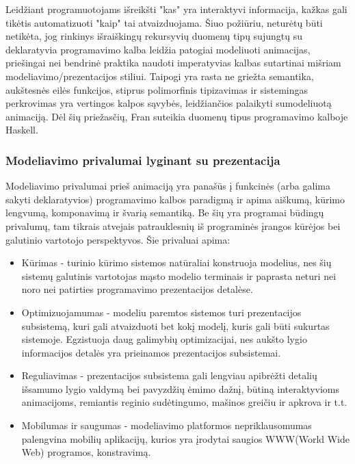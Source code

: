 Leidžiant programuotojams išreikšti "kas" yra interaktyvi informacija, kažkas gali tikėtis automatizuoti "kaip" tai atvaizduojama. Šiuo požiūriu, neturėtų būti netikėta, jog rinkinys išraiškingų rekursyvių duomenų tipų sujungtų su deklaratyvia programavimo kalba leidžia patogiai modeliuoti animacijas, priešingai nei bendrinė praktika naudoti imperatyvias kalbas sutartinai mišriam modeliavimo/prezentacijos stiliui. Taipogi yra rasta ne griežta semantika, aukštesnės eilės funkcijos, stiprus polimorfinis tipizavimas ir sistemingas perkrovimas yra vertingos kalpos sąvybės, leidžiančios palaikyti sumodeliuotą animaciją. Dėl šių priežasčių, Fran suteikia duomenų tipus programavimo kalboje Haskell.

\subsubsection{Modeliavimo privalumai lyginant su prezentacija}

Modeliavimo privalumai prieš animaciją yra panašūs į funkcinės (arba galima sakyti deklaratyvios) programavimo kalbos paradigmą ir apima aiškumą, kūrimo lengvumą, komponavimą ir švarią semantiką. Be šių yra programai būdingų privalumų, tam tikrais atvejais patrauklesnių iš programinės įrangos kūrėjos bei galutinio vartotojo perspektyvos. Šie privaluai apima:

\begin{itemize}

	\item Kūrimas - turinio kūrimo sistemos natūraliai konstruoja modelius, nes šių sistemų galutinis vartotojas mąsto modelio terminais ir paprasta neturi nei noro nei patirties programavimo prezentacijos detalėse.

	\item Optimizuojamumas - modeliu paremtos sistemos turi prezentacijos subsistemą, kuri gali atvaizduoti bet kokį modelį, kuris gali būti sukurtas sistemoje. Egzistuoja daug galimybių optimizacijai, nes aukšto lygio informacijos detalės yra prieinamos prezentacijos subsistemai.

	\item Reguliavimas - prezentacijos subsistema gali lengviau apibrėžti detalių išsamumo lygio valdymą bei pavyzdžių ėmimo dažnį, būtiną interaktyvioms animacijoms, remiantis reginio sudėtingumo, mašinos greičiu ir apkrova ir t.t.

	\item Mobilumas ir saugumas - modeliavimo platformos nepriklausomumas palengvina mobilių aplikacijų, kurios yra įrodytai saugios WWW(World Wide Web) programos, konstravimą.

\end{itemize}

